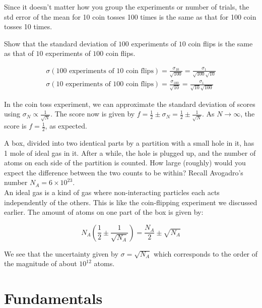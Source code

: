 \documentclass[12pt, a4paper]{article}
\newcounter{exa}
\begin{document}
Since it doesn’t matter how you group the experiments or number of trials, the std error of the mean for 10 coin tosses 100 times is the same as that for 100 coin tosses 10 times.

\begin{texample}
Show that the standard deviation of $100$ experiments of $10$ coin flips is the same as that of $10$ experiments of $100$ coin flips.

\begin{align*}
\sigma (\text{$100$ experiments of $10$ coin flips}) = \frac{\sigma_{10}}{\sqrt{100}}=\frac{\sigma_1}{\sqrt{100}\sqrt{10}} \\
\sigma (\text{$10$ experiments of $100$ coin flips}) = \frac{\sigma_{100}}{\sqrt{10}}=\frac{\sigma_1}{\sqrt{10}\sqrt{100}}
\end{align*}
\end{texample}

In the coin toss experiment, we can approximate the standard deviation of scores using $\sigma_N \propto \frac{1}{\sqrt{N}}$. The score now is given by $f=\frac{1}{2} \pm \sigma_N = \frac{1}{2} \pm \frac{1}{\sqrt{N}}$. As $N\to\infty$, the score is $f=\frac{1}{2}$, as expected.

\begin{texample}
A box, divided into two identical parts by a partition with a small hole in it, has 1 mole of ideal gas in it. After a while, the hole is plugged up, and the number of atoms on each side of the partition is counted. How large (roughly) would you expect the difference between the two counts to be within? Recall Avogadro's number $N_A=6\times10^{23}$. \\

An ideal gas is a kind of gas where non-interacting particles each acts independently of the others. This is like the coin-flipping experiment we discussed earlier. The amount of atoms on one part of the box is given by:

$$N_A \left(\frac{1}{2} \pm \frac{1}{\sqrt{N_A}}\right) = \frac{N_A}{2} \pm \sqrt{N_A}$$

We see that the uncertainty given by $\sigma=\sqrt{N_A}$ which corresponds to the order of the magnitude of about $10^{12}$ atoms.
\end{texample}

\section{Fundamentals}
\end{document}
